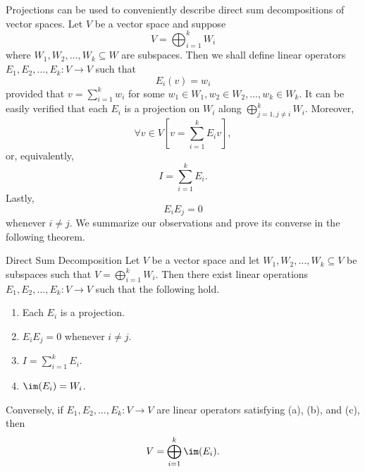 \documentclass[math_245.tex]{subfiles}
\begin{document}
    \begin{remark}
        Projections can be used to conveniently describe direct sum decompositions of vector spaces. Let $V$ be a vector space and suppose
        \begin{equation*}
            V = \bigoplus^{k}_{i=1} W_i
        \end{equation*}
        where $W_1, W_2, \ldots, W_k\subseteq W$ are subspaces. Then we shall define linear operators $E_1, E_2, \ldots, E_k:V\to V$ such that
        \begin{equation*}
            E_i(v) = w_i
        \end{equation*}
        provided that $v = \sum^{k}_{i=1} w_i$ for some $w_1\in W_1, w_2\in W_2, \ldots, w_k\in W_k$. It can be easily verified that each $E_i$ is a projection on $W_i$ along $\bigoplus^{k}_{j=1, j\neq i} W_i$. Moreover,
        \begin{equation*}
            \forall v\in V \left[ v = \sum^{k}_{i=1} E_iv \right],
        \end{equation*}
        or, equivalently,
        \begin{equation*}
            I = \sum^{k}_{i=1} E_i. 
        \end{equation*}
        Lastly,
        \begin{equation*}
            E_iE_j = 0
        \end{equation*}
        whenever $i\neq j$. We summarize our observations and prove its converse in the following theorem.
    \end{remark}

    \begin{theorem}{Direct Sum Decomposition}
        Let $V$ be a vector space and let $W_1, W_2, \ldots, W_k\subseteq V$ be subspaces such that $V = \bigoplus^{k}_{i=1} W_i$. Then there exist linear operations $E_1, E_2, \ldots, E_k:V\to V$ such that the following hold.
        \begin{enumerate}
            \item Each $E_i$ is a projection.
            \item $E_iE_j = 0$ whenever $i\neq j$. 
            \item $I = \sum^{k}_{i=1} E_i$.
            \item $\im(E_i) = W_i$.
        \end{enumerate}
        Conversely, if $E_1, E_2, \ldots, E_k:V\to V$ are linear operators satisfying (a), (b), and (c), then
        \begin{equation*}
            V = \bigoplus^{k}_{i=1} \im(E_i).
        \end{equation*}
    \end{theorem}
\end{document}
